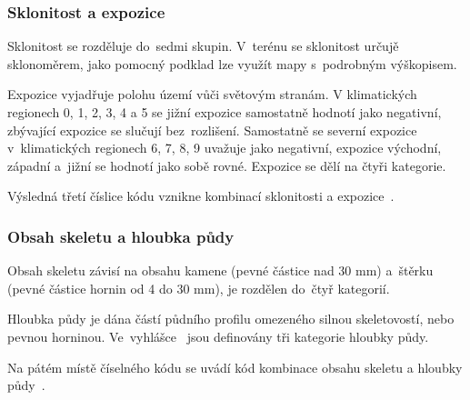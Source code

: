 \subsubsection{Sklonitost a expozice}
\label{sklonitost_expozice}

Sklonitost se rozděluje do~sedmi skupin. V~terénu se sklonitost určujě sklonoměrem, jako pomocný podklad lze využít mapy s~podrobným výškopisem.

Expozice vyjadřuje polohu území  vůči světovým stranám. V klimatických regionech 0, 1, 2, 3, 4 a 5 se jižní expozice samostatně hodnotí jako negativní, zbývající expozice se slučují bez~rozlišení. Samostatně se severní expozice v~klimatických regionech 6, 7, 8, 9 uvažuje jako negativní, expozice východní, západní a~jižní se hodnotí jako sobě rovné. Expozice se dělí na čtyři kategorie.

Výsledná třetí číslice kódu  vznikne kombinací sklonitosti a expozice~\citep{vyhlaska_327}.

\subsubsection{Obsah skeletu a hloubka půdy}
\label{hloubka_pudy_obsah_skeletu}

Obsah skeletu závisí na obsahu kamene (pevné částice nad 30 mm) a~štěrku (pevné částice hornin od 4 do 30 mm), je rozdělen do~čtyř kategorií.

Hloubka půdy je dána částí půdního profilu omezeného silnou skeletovostí, nebo pevnou horninou. Ve~vyhlášce~\citep{vyhlaska_327} jsou definovány tři kategorie hloubky půdy.

Na pátém místě číselného kódu  se uvádí kód kombinace obsahu skeletu a hloubky půdy~\citep{vyhlaska_327}.
